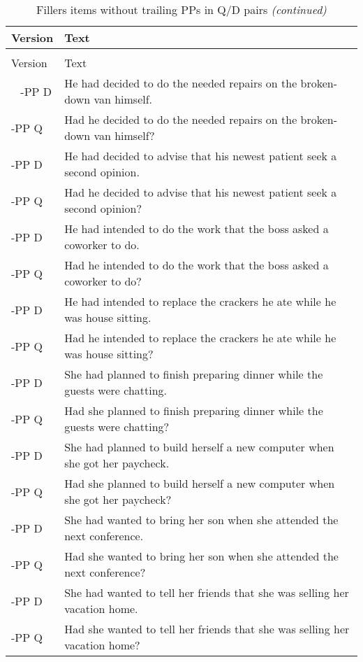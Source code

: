 \documentclass[11pt,oneside]{book}
\begin{document}
\begin{longtable}{ll}
\caption{\label{tab:unnamed-chunk-3}Fillers items without trailing PPs in Q/D pairs}\\
\toprule
Version & Text\\
\midrule
\endfirsthead
\caption[]{\label{tab:unnamed-chunk-3}Fillers items without trailing PPs in Q/D pairs \textit{(continued)}}\\
\toprule
Version & Text\\
\midrule
\endhead
\
\endfoot
\bottomrule
\endlastfoot
-PP D & He had decided to do the needed repairs on the broken-down van himself.\\
-PP Q & Had he decided to do the needed repairs on the broken-down van himself?\\
\addlinespace
-PP D & He had decided to advise that his newest patient seek a second opinion.\\
-PP Q & Had he decided to advise that his newest patient seek a second opinion?\\
\addlinespace
-PP D & He had intended to do the work that the boss asked a coworker to do.\\
-PP Q & Had he intended to do the work that the boss asked a coworker to do?\\
\addlinespace
-PP D & He had intended to replace the crackers he ate while he was house sitting.\\
-PP Q & Had he intended to replace the crackers he ate while he was house sitting?\\
\addlinespace
-PP D & She had planned to finish preparing dinner while the guests were chatting.\\
-PP Q & Had she planned to finish preparing dinner while the guests were chatting?\\
\addlinespace
-PP D & She had planned to build herself a new computer when she got her paycheck.\\
-PP Q & Had she planned to build herself a new computer when she got her paycheck?\\
\addlinespace
-PP D & She had wanted to bring her son when she attended the next conference.\\
-PP Q & Had she wanted to bring her son when she attended the next conference?\\
\addlinespace
-PP D & She had wanted to tell her friends that she was selling her vacation home.\\
-PP Q & Had she wanted to tell her friends that she was selling her vacation home?\\

\end{longtable}
\end{document}
